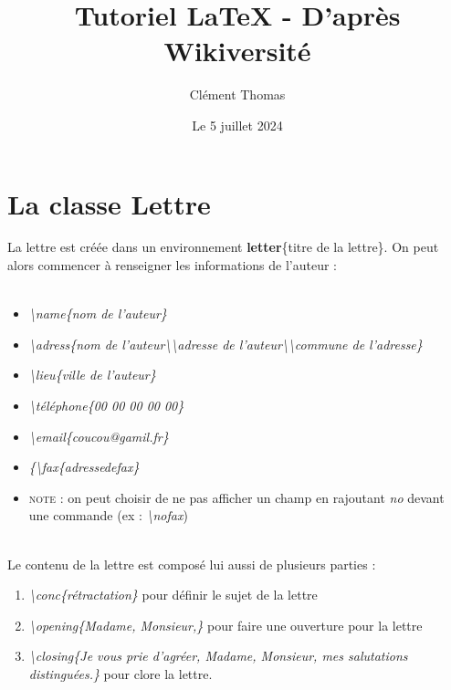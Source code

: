 \documentclass[a4paper, 10pt]{book}
\begin{document}
\frontmatter

\title{Tutoriel LaTeX - D'après Wikiversité}
\author{Clément Thomas}
\date{Le 5 juillet 2024}
\maketitle


\mainmatter

\chapter{La classe Lettre}
La lettre est créée dans un environnement \textbf{letter}\{titre de la lettre\}. On peut alors commencer à renseigner les informations de l'auteur : \\ \\

\begin{itemize}
\item \textit{\textbackslash name\{nom de l'auteur\}}
\item \textit{\textbackslash adress\{nom de l'auteur\textbackslash \textbackslash adresse de l'auteur\textbackslash \textbackslash commune de l'adresse\}}
\item \textit{\textbackslash lieu\{ville de l'auteur\}}
\item \textit{\textbackslash téléphone\{00 00 00 00 00\}}
\item \textit{\textbackslash email\{coucou@gamil.fr\}}
\item \textit{\{\textbackslash fax\{adressedefax\}}
\item \textsc{note} : on peut choisir de ne pas afficher un champ en rajoutant \textit{no} devant une commande (ex : \textit{\textbackslash nofax})\\ \\
\end{itemize}

Le contenu de la lettre est composé lui aussi de plusieurs parties :\\

\begin{enumerate}
\item \textit{\textbackslash conc\{rétractation\}} pour définir le sujet de la lettre
\item \textit{\textbackslash opening\{Madame, Monsieur,\}} pour faire une ouverture pour la lettre
\item \textit{\textbackslash closing\{Je vous prie d'agréer, Madame, Monsieur,
mes salutations distinguées.\}} pour clore la lettre.\\ \\
\end{enumerate}	
\end{document}
